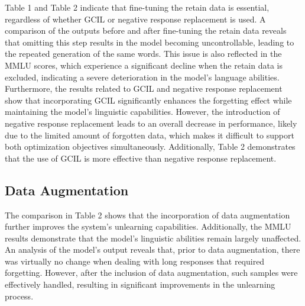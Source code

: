 \documentclass[11pt]{article}
\begin{document}

Table 1 and Table 2 indicate that fine-tuning the retain data is essential, regardless of whether GCIL or negative response replacement is used. A comparison of the outputs before and after fine-tuning the retain data reveals that omitting this step results in the model becoming uncontrollable, leading to the repeated generation of the same words. This issue is also reflected in the MMLU scores, which experience a significant decline when the retain data is excluded, indicating a severe deterioration in the model's language abilities. Furthermore, the results related to GCIL and negative response replacement show that incorporating GCIL significantly enhances the forgetting effect while maintaining the model's linguistic capabilities. However, the introduction of negative response replacement leads to an overall decrease in performance, likely due to the limited amount of forgotten data, which makes it difficult to support both optimization objectives simultaneously. Additionally, Table 2 demonstrates that the use of GCIL is more effective than negative response replacement.

\subsection{Data Augmentation} 

The comparison in Table 2 shows that the incorporation of data augmentation further improves the system's unlearning capabilities. Additionally, the MMLU results demonstrate that the model’s linguistic abilities remain largely unaffected. An analysis of the model's output reveals that, prior to data augmentation, there was virtually no change when dealing with long responses that required forgetting. However, after the inclusion of data augmentation, such samples were effectively handled, resulting in significant improvements in the unlearning process.
\fi
\end{document}
